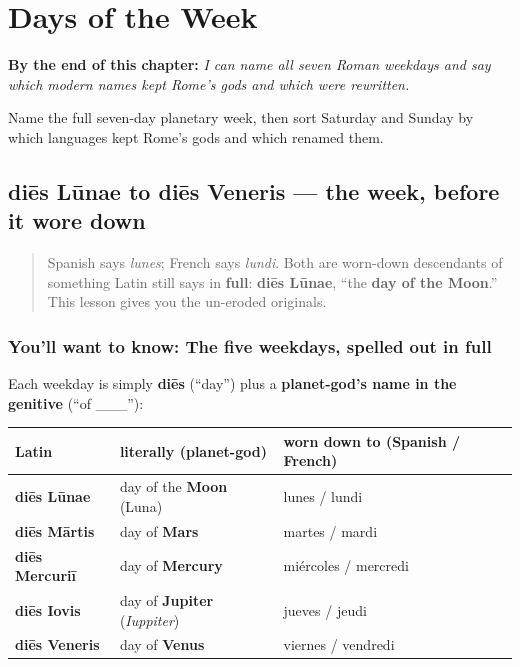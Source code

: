 
\chapter{Days of the Week}
\label{ch:la-days-of-the-week}

\begin{chapteropening}
\textbf{By the end of this chapter:} \emph{I can name all seven Roman weekdays and say which modern names kept Rome's gods and which were rewritten.}

Name the full seven-day planetary week, then sort Saturday and Sunday by which languages kept Rome's gods and which renamed them.
\end{chapteropening}

\section[diēs Lūnae, Mārtis, Mercuriī, Iovis …]{diēs Lūnae to diēs Veneris — the week, before it wore down}

\label{lesson:LA-C05-dies-lunae-veneris}



\begin{quote}
Spanish says \emph{lunes}; French says \emph{lundi}. Both are worn-down descendants of something Latin still says in \textbf{full}: \textbf{diēs Lūnae}, \textquotedblleft{}the \textbf{day of the Moon}.\textquotedblright{} This lesson gives you the un-eroded originals.
\end{quote}

\subsection*{You'll want to know: The five weekdays, spelled out in full}
Each weekday is simply \textbf{diēs} (\textquotedblleft{}day\textquotedblright{}) plus a \textbf{planet-god's name in the genitive} (\textquotedblleft{}of \_\_\_\textquotedblright{}):

\noindent
\begin{tabularx}{\linewidth}{@{}>{\raggedright\arraybackslash}X>{\raggedright\arraybackslash}X>{\raggedright\arraybackslash}X@{}}
\toprule
\textbf{Latin} & \textbf{literally (planet-god)} & \textbf{worn down to (Spanish / French)} \\
\midrule
\textbf{diēs Lūnae} & day of the \textbf{Moon} (Luna) & lunes / lundi \\
\textbf{diēs Mārtis} & day of \textbf{Mars} & martes / mardi \\
\textbf{diēs Mercuriī} & day of \textbf{Mercury} & miércoles / mercredi \\
\textbf{diēs Iovis} & day of \textbf{Jupiter} (\emph{Iuppiter}) & jueves / jeudi \\
\textbf{diēs Veneris} & day of \textbf{Venus} & viernes / vendredi \\
\bottomrule
\end{tabularx}

